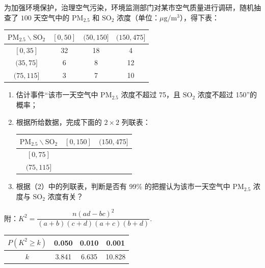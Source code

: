 \begin{problem}
为加强环境保护，治理空气污染，环境监测部门对某市空气质量进行调研，随机抽查了 \(100\) 天空气中的 \(\mathrm{PM}_{2.5}\) 和 \(\mathrm{SO}_2\) 浓度（单位：\(\mu\mathrm{g}/\mathrm{m}^3\)），得下表：

\begin{center}
\begin{tabular}{c|ccc}
\(\mathrm{PM}_{2.5}\backslash\mathrm{SO}_2\) & \([0,50]\) & \((50,150]\) & \((150,475]\) \\
\hline
\([0,35]\) & 32 & 18 & 4 \\
\((35,75]\) & 6 & 8 & 12 \\
\((75,115]\) & 3 & 7 & 10 \\
\end{tabular}
\end{center}

\begin{enumerate}
\item 估计事件“该市一天空气中 \(\mathrm{PM}_{2.5}\) 浓度不超过 75，且 \(\mathrm{SO}_2\) 浓度不超过 150”的概率；
\item 根据所给数据，完成下面的 \(2\times 2\) 列联表：

\begin{center}
\begin{tabular}{c|cc}
\(\mathrm{PM}_{2.5}\backslash\mathrm{SO}_2\) & \([0,150]\) & \((150,475]\) \\
\hline
\([0,75]\) & & \\
\((75,115]\) & & \\
\end{tabular}
\end{center}

\item 根据（2）中的列联表，判断是否有 99\% 的把握认为该市一天空气中 \(\mathrm{PM}_{2.5}\) 浓度与 \(\mathrm{SO}_2\) 浓度有关？
\end{enumerate}

附：\(K^2=\dfrac{n(ad-bc)^2}{(a+b)(c+d)(a+c)(b+d)}\).

\begin{center}
\begin{tabular}{c|ccc}
\(P(K^2\ge k)\) & 0.050 & 0.010 & 0.001 \\
\hline
\(k\) & 3.841 & 6.635 & 10.828 \\
\end{tabular}
\end{center}
\end{problem}

